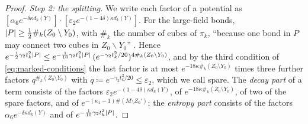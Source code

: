 \documentclass[11pt]{preprint}
\DeclarePairedDelimiter{\abs}{\lvert}{\rvert}
\numberwithin{equation}{section}
\theoremstyle{definition}
\theoremstyle{remark}
\theoremstyle{plain}
\begin{document}
\begin{proof}
\emph{Step 2: the splitting.} We write each factor of a potential as $[\alpha_6e^{-\delta\kappa d_k(Y)}] \cdot [\varepsilon_2e^{-(1 - 4\delta)\kappa d_k(Y)}]$. For the large-field bonds, $\abs P \geq \frac12\#_k(Z_0 \setminus Y_0)$, with $\#_k$ the number of cubes of $\pi_k$, ``because one bond in $P$ may connect two cubes in $Z_0 \backslash Y_0$'' \cite[p.~18]{BalabanRG2}. Hence $e^{-\frac12\gamma_2t_k^2\abs P} \leq e^{-\frac{1}{10}\gamma_2t_k^2\abs P}\,(e^{-\gamma_2t_k^2/20})^{4\#_k(Z_0 \setminus Y_0)}$, and by the third condition of \eqref{eq:marked-conditions} the last factor is at most $e^{-18\kappa\#_k(Z_0 \setminus Y_0)}$ times three further factors $q^{\#_k(Z_0 \setminus Y_0)}$ with $q \coloneqq e^{-\gamma_2t_k^2/20} \leq \varepsilon_2$, which we call spare. The \emph{decay part} of a term consists of the factors $\varepsilon_2e^{-(1 - 4\delta)\kappa d_k(Y)}$, of $e^{-18\kappa\#_k(Z_0 \setminus Y_0)}$, of two of the spare factors, and of $e^{-(\kappa_1 - 1)\#(M \setminus Z_0')}$; the \emph{entropy part} consists of the factors $\alpha_6e^{-\delta\kappa d_k(Y)}$ and of $e^{-\frac{1}{10}\gamma_2t_k^2\abs P}$.


\end{proof}
\end{document}
